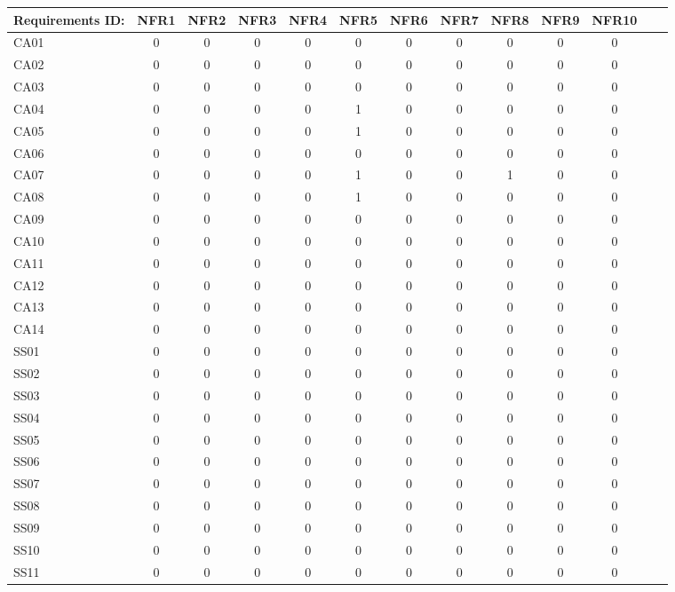 \documentclass [10pt]{article}
\begin{document}
\begin{longtable}{ | p{}  | c | c | c | c | c | c | c | c | c | c | c | c | }
\hline
	Requirements ID: & NFR1 & NFR2 & NFR3 & NFR4 & NFR5 & NFR6 & NFR7 & NFR8 & NFR9 & NFR10 \\ \hline
	CA01 & 0 & 0 & 0 & 0 & 0 & 0 & 0 & 0 & 0 & 0 \\ \hline
	CA02 & 0 & 0 & 0 & 0 & 0 & 0 & 0 & 0 & 0 & 0 \\ \hline
	CA03 & 0 & 0 & 0 & 0 & 0 & 0 & 0 & 0 & 0 & 0 \\ \hline
	CA04 & 0 & 0 & 0 & 0 & 1 & 0 & 0 & 0 & 0 & 0 \\ \hline
	CA05 & 0 & 0 & 0 & 0 & 1 & 0 & 0 & 0 & 0 & 0 \\ \hline
	CA06 & 0 & 0 & 0 & 0 & 0 & 0 & 0 & 0 & 0 & 0 \\ \hline
	CA07 & 0 & 0 & 0 & 0 & 1 & 0 & 0 & 1 & 0 & 0 \\ \hline
	CA08 & 0 & 0 & 0 & 0 & 1 & 0 & 0 & 0 & 0 & 0 \\ \hline
	CA09 & 0 & 0 & 0 & 0 & 0 & 0 & 0 & 0 & 0 & 0 \\ \hline
	CA10 & 0 & 0 & 0 & 0 & 0 & 0 & 0 & 0 & 0 & 0 \\ \hline
	CA11 & 0 & 0 & 0 & 0 & 0 & 0 & 0 & 0 & 0 & 0 \\ \hline
	CA12 & 0 & 0 & 0 & 0 & 0 & 0 & 0 & 0 & 0 & 0 \\ \hline
	CA13 & 0 & 0 & 0 & 0 & 0 & 0 & 0 & 0 & 0 & 0 \\ \hline
	CA14 & 0 & 0 & 0 & 0 & 0 & 0 & 0 & 0 & 0 & 0 \\ \hline
	SS01 & 0 & 0 & 0 & 0 & 0 & 0 & 0 & 0 & 0 & 0 \\ \hline
	SS02 & 0 & 0 & 0 & 0 & 0 & 0 & 0 & 0 & 0 & 0 \\ \hline
	SS03 & 0 & 0 & 0 & 0 & 0 & 0 & 0 & 0 & 0 & 0 \\ \hline
	SS04 & 0 & 0 & 0 & 0 & 0 & 0 & 0 & 0 & 0 & 0 \\ \hline
	SS05 & 0 & 0 & 0 & 0 & 0 & 0 & 0 & 0 & 0 & 0 \\ \hline
	SS06 & 0 & 0 & 0 & 0 & 0 & 0 & 0 & 0 & 0 & 0 \\ \hline
	SS07 & 0 & 0 & 0 & 0 & 0 & 0 & 0 & 0 & 0 & 0 \\ \hline
	SS08 & 0 & 0 & 0 & 0 & 0 & 0 & 0 & 0 & 0 & 0 \\ \hline
	SS09 & 0 & 0 & 0 & 0 & 0 & 0 & 0 & 0 & 0 & 0 \\ \hline
	SS10 & 0 & 0 & 0 & 0 & 0 & 0 & 0 & 0 & 0 & 0 \\ \hline
	SS11 & 0 & 0 & 0 & 0 & 0 & 0 & 0 & 0 & 0 & 0 \\ \hline

\end{longtable}
\end{document}
